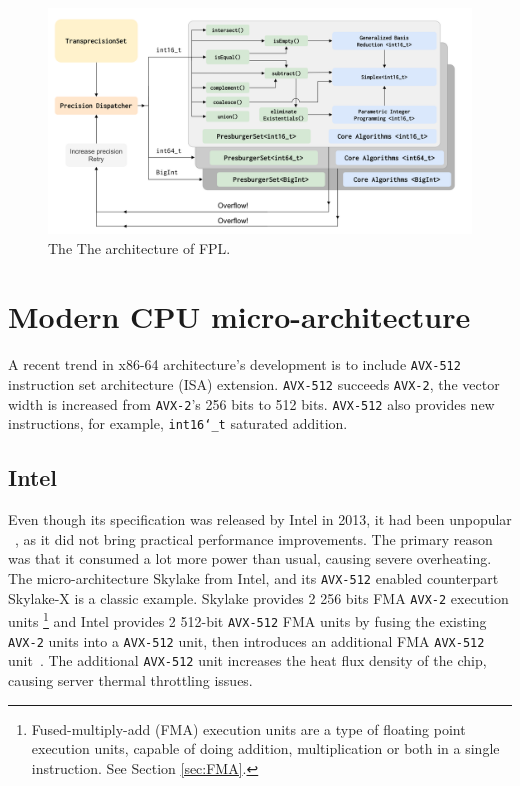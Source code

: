 \documentclass[logo,bsc,singlespacing,parskip]{infthesis}
\newcommand{\dtshort}{\texttt{int16\char`_t}}
\begin{document}
\begin{figure}
    \includegraphics[width=\linewidth]{image/transprecision.png}
    \caption{The The architecture of FPL.}
    \label{fig:fpl_arch}
\end{figure}

\section{Modern CPU micro-architecture}
\label{sec:avx512}

A recent trend in x86-64 architecture’s development is to include \texttt{AVX-512}
instruction set architecture (ISA) extension. \texttt{AVX-512} succeeds \texttt{AVX-2}, the vector
width is increased from \texttt{AVX-2}’s 256 bits to 512 bits. \texttt{AVX-512} also provides new
instructions, for example, \dtshort{} saturated addition.

\subsection{Intel}

Even though its specification was released by Intel in 2013, it had been
unpopular ~\cite{linusHopeAvx512Die}, as it did not bring practical performance
improvements. The primary reason was that it consumed a lot more power than
usual, causing severe overheating. The micro-architecture Skylake from Intel,
and its \texttt{AVX-512} enabled counterpart Skylake-X is a classic example.
Skylake provides 2 256 bits FMA \texttt{AVX-2} execution units
\footnote{Fused-multiply-add (FMA) execution units are a type of floating point
execution units, capable of doing addition, multiplication or both in a single
instruction. See Section \ref{sec:FMA}.} and Intel provides 2 512-bit
\texttt{AVX-512} FMA units by fusing the existing \texttt{AVX-2}  units into a
\texttt{AVX-512} unit, then introduces an additional FMA \texttt{AVX-512}
unit~\cite{SLK-X}. The additional \texttt{AVX-512} unit increases the heat flux
density of the chip, causing server thermal throttling issues. 
\end{document}
